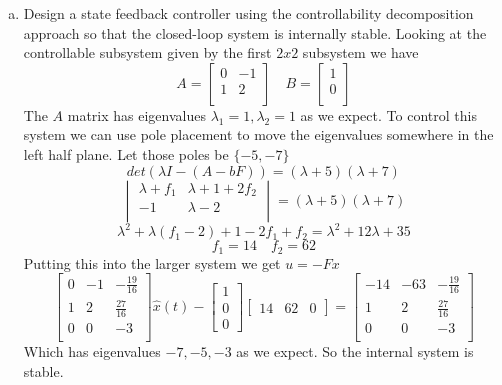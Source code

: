 \documentclass{article}
\begin{document}
\begin{enumerate}[(a)]
\item Design a state feedback controller using the controllability decomposition approach so that the closed-loop system is internally stable.
\newline
\newline
Looking at the controllable subsystem given by the first $2x2$ subsystem we have
$$
A =
\begin{bmatrix}
0 & -1 \\
1 &  2 \\
\end{bmatrix}
\quad
B =
\begin{bmatrix}
1 \\
0 \\
\end{bmatrix}
$$
The $A$ matrix has eigenvalues $\lambda_1 = 1, \lambda_2 = 1$ as we expect.
To control this system we can use pole placement to move the eigenvalues somewhere in the left half plane.
Let those poles be $\{-5, -7\}$
$$ det(\lambda I - (A-bF)) = (\lambda+5)(\lambda+7) $$
$$
\begin{vmatrix}
\lambda + f_1 & \lambda + 1 + 2f_2 \\
-1 & \lambda - 2 \\
\end{vmatrix}
= (\lambda+5)(\lambda+7)
$$
$$
\lambda^2 + \lambda(f_1 - 2) + 1 -2f_1 +f_2
= \lambda^2 + 12 \lambda +35
$$
$$ f_1 = 14 \quad f_2 = 62 $$
Putting this into the larger system we get $u=-Fx$
$$
\begin{bmatrix}
0 & -1 & -\frac{19}{16} \\
1 &  2 &  \frac{27}{16} \\
0 &  0 & -3 \\
\end{bmatrix}
\hat{x}(t)
-
\begin{bmatrix} 1 \\ 0 \\ 0 \end{bmatrix}
\begin{bmatrix}14 & 62 & 0 \end{bmatrix}
=
\begin{bmatrix}
-14 & -63 & -\frac{19}{16} \\
  1 &   2 &  \frac{27}{16} \\
  0 &   0 & -3 \\
\end{bmatrix}
$$
Which has eigenvalues $-7,-5,-3$ as we expect.
So the internal system is stable.


\end{enumerate}
\end{document}
